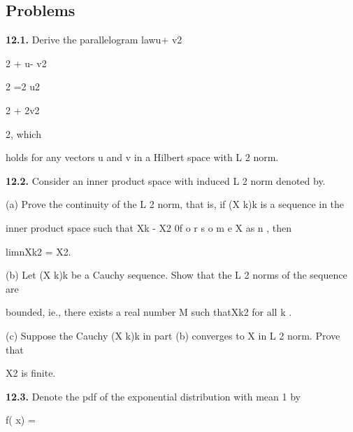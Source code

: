 \subsection*{Problems}

\textbf{12.1.} Derive the parallelogram lawu+ v2

2 + u- v2

2 =2 u2

2 + 2v2

2, which

holds for any vectors u and v in a Hilbert space with L 2 norm.

\textbf{12.2.} Consider an inner product space with induced L 2 norm denoted by.

(a) Prove the continuity of the L 2 norm, that is, if (X k)k is a sequence in the

inner product space such that Xk - X2 \to 0f o r s o m e X as n \to\infty , then

limn\to\infty Xk2 = X2.

(b) Let (X k)k be a Cauchy sequence. Show that the L 2 norms of the sequence are

bounded, ie., there exists a real number M such thatXk2 \leqM for all k .

(c) Suppose the Cauchy (X k)k in part (b) converges to X in L 2 norm. Prove that

X2 is finite.

\textbf{12.3.} Denote the pdf of the exponential distribution with mean 1 by

f( x) =

